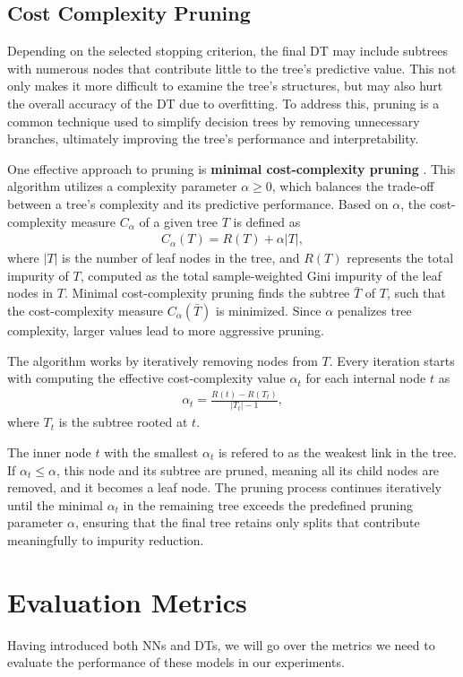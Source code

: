 \subsection{Cost Complexity Pruning}
Depending on the selected stopping criterion,
the final DT may include subtrees with numerous nodes
that contribute little to the tree's predictive value.
This not only makes it more difficult to examine the tree's structures,
but may also hurt the overall accuracy of the DT due to overfitting.
To address this, pruning is a common technique used to simplify decision trees
by removing unnecessary branches, ultimately improving the tree's performance and interpretability.

One effective approach to pruning is \textbf{minimal cost-complexity pruning} \cite{decision_trees}.
This algorithm utilizes a complexity parameter $\alpha \ge 0$,
which balances the trade-off between a tree's complexity and its predictive performance.
Based on $\alpha$, the cost-complexity measure $C_{\alpha}$ of a given tree $T$ is defined as
\begin{align}
C_{\alpha}(T) = R(T) + \alpha |T|,
\end{align}
where $|T|$ is the number of leaf nodes in the tree, and $R(T)$ represents the total impurity of $T$,
computed as the total sample-weighted Gini impurity of the leaf nodes in $T$.
Minimal cost-complexity pruning finds the subtree $\bar{T}$ of $T$, such that the cost-complexity measure $C_{\alpha}(\bar{T})$ is minimized.
Since $\alpha$ penalizes tree complexity, larger values lead to more aggressive pruning.

The algorithm works by iteratively removing nodes from $T$.
Every iteration starts with computing the effective cost-complexity value $\alpha_t$ for each internal node $t$ as
\begin{align}
\alpha_t = \frac{R(t) - R(T_t)}{|T_t| - 1},
\end{align}
where $T_t$ is the subtree rooted at $t$.

The inner node $t$ with the smallest $\alpha_t$ is refered to as the weakest link in the tree.
If $\alpha_t \le \alpha$, this node and its subtree are pruned, meaning all its child nodes are removed, and it becomes a leaf node.
The pruning process continues iteratively until the minimal $\alpha_t$ in the remaining tree exceeds the predefined pruning parameter $\alpha$,
ensuring that the final tree retains only splits that contribute meaningfully to impurity reduction.

\section{Evaluation Metrics}
Having introduced both NNs and DTs,
we will go over the metrics we need to evaluate the performance of these models in our experiments.

